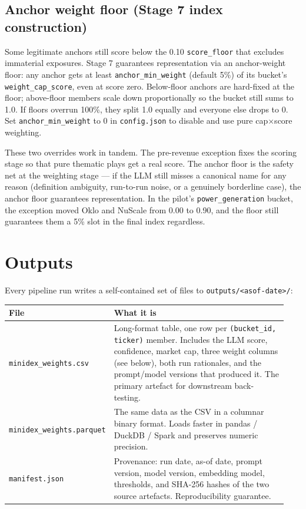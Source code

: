 \documentclass[11pt,a4paper,oneside]{article}
\begin{document}
\subsection*{Anchor weight floor (Stage 7 index construction)}

Some legitimate anchors still score below the 0.10 \texttt{score\_floor} that excludes immaterial exposures. Stage 7 guarantees representation via an anchor-weight floor: any anchor gets at least \texttt{anchor\_min\_weight} (default 5\%) of its bucket's \texttt{weight\_cap\_score}, even at score zero. Below-floor anchors are hard-fixed at the floor; above-floor members scale down proportionally so the bucket still sums to 1.0. If floors overrun 100\%, they split 1.0 equally and everyone else drops to 0. Set \texttt{anchor\_min\_weight} to 0 in \texttt{config.json} to disable and use pure cap\(\times\)score weighting.

These two overrides work in tandem. The pre-revenue exception fixes the scoring stage so that pure thematic plays get a real score. The anchor floor is the safety net at the weighting stage --- if the LLM still misses a canonical name for any reason (definition ambiguity, run-to-run noise, or a genuinely borderline case), the anchor floor guarantees representation. In the pilot's \texttt{power\_generation} bucket, the exception moved Oklo and NuScale from 0.00 to 0.90, and the floor still guarantees them a 5\% slot in the final index regardless.

\section{Outputs}

Every pipeline run writes a self-contained set of files to \texttt{outputs/<asof-date>/}:

\begin{center}
\begin{tabular}{@{}p{0.30\linewidth} p{0.64\linewidth}@{}}
\toprule
\textbf{File} & \textbf{What it is} \\
\midrule
\texttt{minidex\_weights.csv} & Long-format table, one row per \texttt{(bucket\_id, ticker)} member. Includes the LLM score, confidence, market cap, three weight columns (see below), both run rationales, and the prompt/model versions that produced it. The primary artefact for downstream back-testing. \\
\texttt{minidex\_weights.parquet} & The same data as the CSV in a columnar binary format. Loads faster in pandas / DuckDB / Spark and preserves numeric precision. \\
\texttt{manifest.json} & Provenance: run date, as-of date, prompt version, model version, embedding model, thresholds, and SHA-256 hashes of the two source artefacts. Reproducibility guarantee. \\
\bottomrule
\end{tabular}
\end{center}
\end{document}
